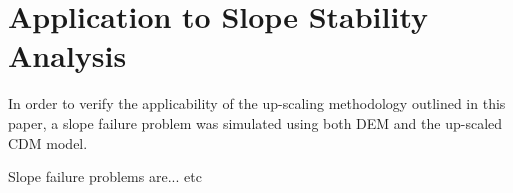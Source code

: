 \section{Application to Slope Stability Analysis}

In order to verify the applicability of the up-scaling methodology outlined in this paper, a slope failure problem was simulated using both DEM and the up-scaled CDM model. 

Slope failure problems are... etc